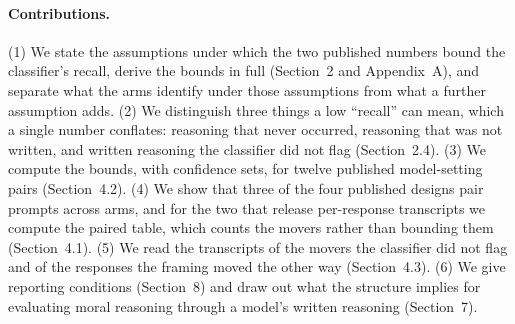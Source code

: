 \documentclass[11pt]{article}
\begin{document}
\paragraph{Contributions.}
(1) We state the assumptions under which the two published numbers bound the classifier's recall, derive the bounds in full (Section~2 and Appendix~A), and separate what the arms identify under those assumptions from what a further assumption adds. (2) We distinguish three things a low ``recall'' can mean, which a single number conflates: reasoning that never occurred, reasoning that was not written, and written reasoning the classifier did not flag (Section~2.4). (3) We compute the bounds, with confidence sets, for twelve published model-setting pairs (Section~4.2). (4) We show that three of the four published designs pair prompts across arms, and for the two that release per-response transcripts we compute the paired table, which counts the movers rather than bounding them (Section~4.1). (5) We read the transcripts of the movers the classifier did not flag and of the responses the framing moved the other way (Section~4.3). (6) We give reporting conditions (Section~8) and draw out what the structure implies for evaluating moral reasoning through a model's written reasoning (Section~7).
\end{document}
